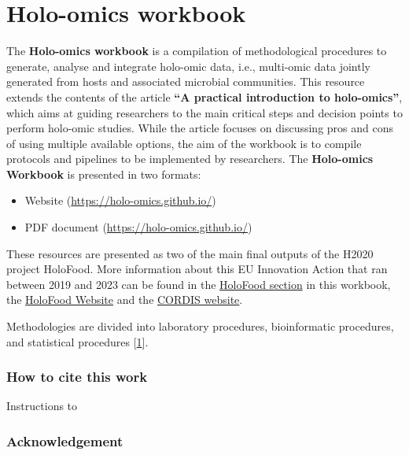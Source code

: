 \documentclass[
]{article}
\author{}
\date{\vspace{-2.5em}}
\providecommand{\tightlist}{%
  \setlength{\itemsep}{0pt}\setlength{\parskip}{0pt}}
\begin{document}
{
\setcounter{tocdepth}{2}
\tableofcontents
}
\hypertarget{holo-omics-workbook}{%
\section*{Holo-omics workbook}\label{holo-omics-workbook}}

The \textbf{Holo-omics workbook} is a compilation of methodological procedures to generate, analyse and integrate holo-omic data, i.e., multi-omic data jointly generated from hosts and associated microbial communities. This resource extends the contents of the article \textbf{``A practical introduction to holo-omics''}, which aims at guiding researchers to the main critical steps and decision points to perform holo-omic studies. While the article focuses on discussing pros and cons of using multiple available options, the aim of the workbook is to compile protocols and pipelines to be implemented by researchers. The \textbf{Holo-omics Workbook} is presented in two formats:

\begin{itemize}
\tightlist
\item
  Website (\url{https://holo-omics.github.io/})
\item
  PDF document (\url{https://holo-omics.github.io/})
\end{itemize}

These resources are presented as two of the main final outputs of the H2020 project HoloFood. More information about this EU Innovation Action that ran between 2019 and 2023 can be found in the \protect\hyperlink{holofood}{HoloFood section} in this workbook, the \href{http://www.holofood.eu}{HoloFood Website} and the \href{https://cordis.europa.eu/project/id/817729}{CORDIS website}.

Methodologies are divided into laboratory procedures, bioinformatic procedures, and statistical procedures {[}\protect\hyperlink{ref-R-base}{1}{]}.

\hypertarget{how-to-cite-this-work}{%
\subsubsection*{How to cite this work}\label{how-to-cite-this-work}}

Instructions to

\hypertarget{acknowledgement}{%
\subsubsection*{Acknowledgement}\label{acknowledgement}}
\end{document}
